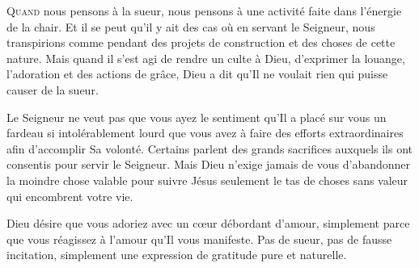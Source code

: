\dvrule








\lettrine{Q}{uand} nous pensons à la sueur,
 nous pensons à une activité faite dans l'énergie de la chair.
 Et il se peut qu'il y ait des cas où en servant le Seigneur,
 nous transpirions \ocadr comme pendant des projets de construction
 et des choses de cette nature. Mais quand il s'est agi de rendre
 un culte à Dieu, d'exprimer la louange, l'adoration
 et des actions de grâce, Dieu a dit qu'Il ne voulait rien
 qui puisse causer de la sueur. 



Le Seigneur ne veut pas que vous ayez le sentiment qu'Il a placé sur vous
 un fardeau si intolérablement lourd que vous avez à faire des efforts
 extraordinaires afin d'accomplir Sa volonté. Certains parlent
 des grands sacrifices 
 auxquels ils ont consentis pour servir le Seigneur.
 Mais Dieu n'exige jamais de vous d'abandonner la moindre chose valable
 pour suivre Jésus \ocadr seulement le tas de choses sans valeur
 qui encombrent votre vie. 

Dieu désire que vous adoriez avec un c\oe{}ur débordant d'amour,
 simplement parce que vous réagissez à l'amour qu'Il vous manifeste.
 Pas de sueur, pas de fausse incitation,
 simplement une expression de gratitude pure et naturelle. 

